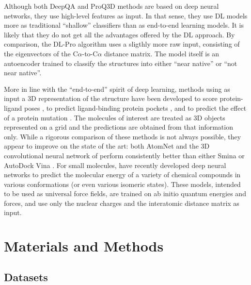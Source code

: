 \documentclass{bioinfo}
\begin{document}
Although both DeepQA and ProQ3D
methods are based on deep neural networks, they use high-level
features as input. In that sense, they use DL models more as
traditional ``shallow'' classifiers than as end-to-end learning
models. It is likely that they do not get all the advantages offered
by the DL approach.
By comparison, the DL-Pro algorithm \citep{nguyen2014dlpro} uses a
sligthly more raw input, consisting of the eigenvectors of the
C$\alpha$-to-C$\alpha$ distance matrix. The model itself is an
autoencoder \citep{hinton2006reducing} trained to classify the
structures into either ``near native'' or ``not near native''.

More in line with the ``end-to-end'' spirit of deep learning, methods
using as input a 3D representation of the structure have been
developed to score protein-ligand poses \citep{wallach2015atomnet,
ragoza2017protein}, to predict ligand-binding protein
pockets \citep{jimenez2017deepsite}, and to predict the effect of a
protein mutation \citep{torng2017}. The molecules of interest are
treated as 3D objects represented on a grid and the predictions are
obtained from that information only. While a rigorous comparison of
these methods is not always possible, they appear to
improve on the state of the art: both
AtomNet \citep{wallach2015atomnet} and the 3D convolutional neural
network of \citealp{ragoza2017protein} perform
consistently better than either Smina \citep{koes2013smina} or AutoDock
Vina \citep{trott2009vina}.
For small molecules, \citealp{schutt2017quantum,
schutt2017moleculenet} have recently developed deep neural networks to predict
the molecular energy of a variety of chemical compounds in various
conformations (or even various isomeric states). These models,
intended to be used as universal force fields, are trained on ab
initio quantum energies and forces, and use only the nuclear charges and the
interatomic distance matrix as input.


\section{Materials and Methods}

\subsection{Datasets}
\end{document}
